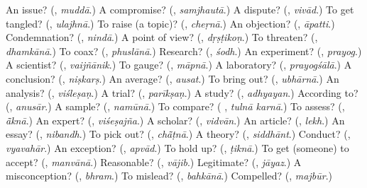 \begin{tcolorbox}[breakable,colback=teal!4,colframe=teal!35!black,title={Before you move on}]
An issue? (\textbf{}, \emph{muddā}.) A compromise? (\textbf{}, \emph{samjhautā}.) A dispute? (\textbf{}, \emph{vivād}.) To get tangled? (\textbf{}, \emph{ulajhnā}.) To raise (a topic)? (\textbf{}, \emph{cheṛnā}.) An objection? (\textbf{}, \emph{āpatti}.) Condemnation? (\textbf{}, \emph{nindā}.) A point of view? (\textbf{}, \emph{dṛṣṭikoṇ}.) To threaten? (\textbf{}, \emph{dhamkānā}.) To coax? (\textbf{}, \emph{phuslānā}.) Research? (\textbf{}, \emph{śodh}.) An experiment? (\textbf{}, \emph{prayog}.) A scientist? (\textbf{}, \emph{vaijñānik}.) To gauge? (\textbf{}, \emph{māpnā}.) A laboratory? (\textbf{}, \emph{prayogśālā}.) A conclusion? (\textbf{}, \emph{niṣkarṣ}.) An average? (\textbf{}, \emph{ausat}.) To bring out? (\textbf{}, \emph{ubhārnā}.) An analysis? (\textbf{}, \emph{viśleṣaṇ}.) A trial? (\textbf{}, \emph{parīkṣaṇ}.) A study? (\textbf{}, \emph{adhyayan}.) According to? (\textbf{}, \emph{anusār}.) A sample? (\textbf{}, \emph{namūnā}.) To compare? (\textbf{ }, \emph{tulnā karnā}.) To assess? (\textbf{}, \emph{ā̃knā}.) An expert? (\textbf{}, \emph{viśeṣajña}.) A scholar? (\textbf{}, \emph{vidvān}.) An article? (\textbf{}, \emph{lekh}.) An essay? (\textbf{}, \emph{nibandh}.) To pick out? (\textbf{}, \emph{chā̃ṭnā}.) A theory? (\textbf{}, \emph{siddhānt}.) Conduct? (\textbf{}, \emph{vyavahār}.) An exception? (\textbf{}, \emph{apvād}.) To hold up? (\textbf{}, \emph{ṭiknā}.) To get (someone) to accept? (\textbf{}, \emph{manvānā}.) Reasonable? (\textbf{}, \emph{vājib}.) Legitimate? (\textbf{}, \emph{jāyaz}.) A misconception? (\textbf{}, \emph{bhram}.) To mislead? (\textbf{}, \emph{bahkānā}.) Compelled? (\textbf{}, \emph{majbūr}.)
\end{tcolorbox}

